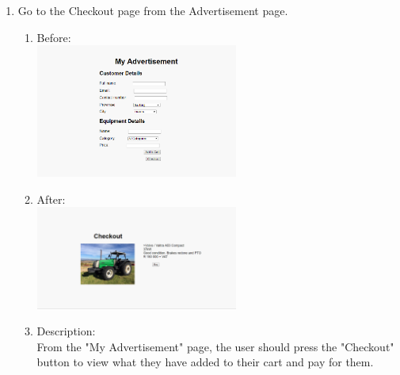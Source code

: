 \documentclass[11pt]{article}
\begin{document}
\begin{enumerate}
		\item Go to the Checkout page from the Advertisement page.
			\begin{enumerate}
				\item Before: \\
					\includegraphics[width=0.55\textwidth]{../Images/Tasks/Task9Before.png}
				\item After: \\
					\includegraphics[width=0.55\textwidth]{../Images/Tasks/Task9After.png}
					\item Description: \\From the "My Advertisement" page, the user should press the "Checkout" button to view what they have added to their cart and pay for them. \newpage
			\end{enumerate}
				

\end{enumerate}
\end{document}
